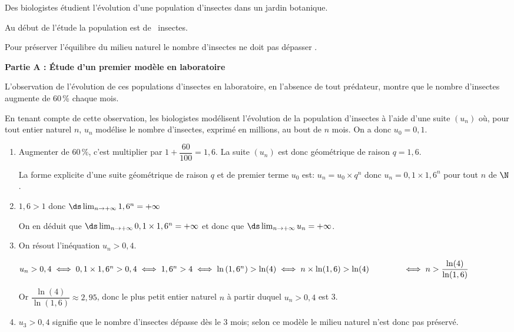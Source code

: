 
\medskip

Des biologistes étudient l'évolution d'une population d'insectes dans un jardin botanique. 

Au début de l'étude la population est de ~insectes.

Pour préserver l'équilibre du milieu naturel le nombre d'insectes ne doit pas dépasser .

\bigskip

\textbf{Partie A : Étude d'un premier modèle en laboratoire}

\medskip

L'observation de l'évolution de ces populations d'insectes en laboratoire, en l'absence de tout prédateur, montre que le nombre d'insectes augmente de 60\,\% chaque mois.

En tenant compte de cette observation, les biologistes modélisent l'évolution de la population d'insectes à l'aide d'une suite $\left(u_n\right)$ où, pour tout entier naturel $n$, $u_n$ modélise le nombre d'insectes, exprimé en millions, au bout de $n$ mois. 
On a donc $u_0 = 0,1$.

\medskip

\begin{enumerate}
\item %
Augmenter de 60\,\%, c'est multiplier par $1+\dfrac{60}{100}=1,6$.
La suite $(u_n)$ est donc géométrique de raison $q=1,6$.

La forme explicite d'une suite géométrique de raison $q$ et de premier terme $u_0$ est: $u_n=u_0\times q^n$ donc $u_n = 0,1 \times 1,6^n$ pour tout $n$ de $\N$.

\item %
$1,6>1$ donc $\ds\lim_{n\to +\infty} 1,6^n = +\infty$

On en déduit que $\ds\lim_{n\to +\infty} 0,1\times 1,6^n = +\infty$ et donc que $\ds\lim_{n\to +\infty} u_n = +\infty$.

\item On résout l'inéquation $u_n > 0,4$.

$u_n>0,4
\iff
0,1\times 1,6^n >0,4
\iff
1,6^n >4
\iff
\ln\left (1,6^n\right ) > \ln(4)
\iff
n\times \ln(1,6)>\ln(4)\\
\phantom{u_n>0,4}
\iff
n>\dfrac{\ln(4)}{\ln(1,6)}$

Or $\dfrac{\ln(4)}{\ln(1,6)}\approx 2,95$, donc le plus petit entier naturel $n$ à partir duquel $u_n>0,4$ est 3.

\item %
$u_3>0,4$ signifie que le nombre d'insectes dépasse  dès le 3\ieme{} mois; selon ce modèle le milieu naturel n'est donc pas préservé.

\end{enumerate}


